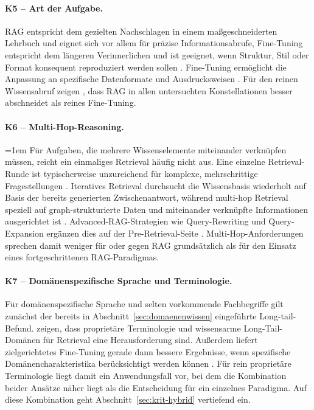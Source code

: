 \paragraph{K5 -- Art der Aufgabe.}\label{krit:k5}
RAG entspricht dem gezielten Nachschlagen in einem maßgeschneiderten Lehrbuch und eignet sich vor allem für präzise Informationsabrufe, Fine-Tuning entspricht dem längeren Verinnerlichen und ist geeignet, wenn Struktur, Stil oder Format konsequent reproduziert werden sollen \autocite[4f.]{Gao.2024}. Fine-Tuning ermöglicht die Anpassung an spezifische Datenformate und Ausdrucksweisen \autocite[10]{Gao.2024}.
Für den reinen Wissensabruf zeigen \textcite[6]{Ovadia.2024}, dass RAG in allen untersuchten Konstellationen besser abschneidet als reines Fine-Tuning.

\paragraph{K6 -- Multi-Hop-Reasoning.}\label{krit:k6}
{\emergencystretch=1em
Für Aufgaben, die mehrere Wissenselemente miteinander verknüpfen müssen, reicht ein einmaliges Retrieval häufig nicht aus. Eine einzelne Retrieval-Runde ist typischerweise unzureichend für komplexe, mehrschrittige Fragestellungen \autocite[10f.]{Gao.2024}.
Iteratives Retrieval durchsucht die Wissensbasis wiederholt auf Basis der bereits generierten Zwischenantwort, während multi-hop Retrieval speziell auf graph-strukturierte Daten und miteinander verknüpfte Informationen ausgerichtet ist \autocite[11]{Gao.2024}.
Advanced-RAG-Strategien wie Query-Rewriting und Query-Expansion ergänzen dies auf der Pre-Retrieval-Seite \autocite[4]{Gao.2024}.
Multi-Hop-Anforderungen sprechen damit weniger für oder gegen RAG grundsätzlich als für den Einsatz eines fortgeschrittenen RAG-Paradigmas.
\par}

\paragraph{K7 -- Domänenspezifische Sprache und Terminologie.}\label{krit:k7}
Für domänenspezifische Sprache und selten vorkommende Fachbegriffe gilt zunächst der bereits in Abschnitt~\ref{sec:domaenenwissen} eingeführte Long-tail-Befund. \textcite[1f.]{Soudani.2024} zeigen, dass proprietäre Terminologie und wissensarme Long-Tail-Domänen für Retrieval eine Herausforderung sind.
Außerdem liefert zielgerichtetes Fine-Tuning gerade dann bessere Ergebnisse, wenn spezifische Domänencharakteristika berücksichtigt werden können \autocite[10]{Gao.2024}.
Für rein proprietäre Terminologie liegt damit ein Anwendungsfall vor, bei dem die Kombination beider Ansätze näher liegt als die Entscheidung für ein einzelnes Paradigma. Auf diese Kombination geht Abschnitt~\ref{sec:krit-hybrid} vertiefend ein.

